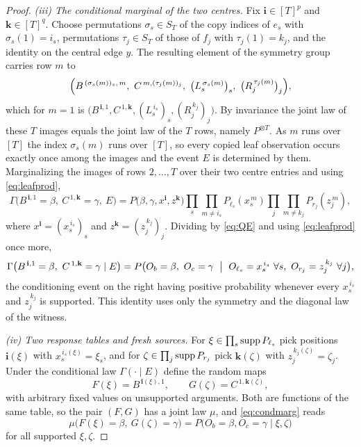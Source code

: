\documentclass[11pt]{article}
\theoremstyle{plain}
\theoremstyle{definition}
\begin{document}
\begin{proof}
\medskip
\emph{(iii) The conditional marginal of the two centres.}
Fix $\mathbf i\in[T]^p$ and $\mathbf k\in[T]^q$. Choose permutations $\sigma_s\in S_T$ of the copy indices of $e_s$ with $\sigma_s(1)=i_s$, permutations $\tau_j\in S_T$ of those of $f_j$ with $\tau_j(1)=k_j$, and the identity on the central edge $y$. The resulting element of the symmetry group carries row $m$ to
\[
\Bigl(B^{\,(\sigma_s(m))_s,\,m},\ C^{\,m,(\tau_j(m))_j},\ \bigl(L_s^{\,\sigma_s(m)}\bigr)_s,\ \bigl(R_j^{\,\tau_j(m)}\bigr)_j\Bigr),
\]
which for $m=1$ is $\bigl(B^{\,\mathbf i,1},C^{\,1,\mathbf k},(L_s^{\,i_s})_s,(R_j^{\,k_j})_j\bigr)$. By invariance the joint law of these $T$ images equals the joint law of the $T$ rows, namely $P^{\otimes T}$. As $m$ runs over $[T]$ the index $\sigma_s(m)$ runs over $[T]$, so every copied leaf observation occurs exactly once among the images and the event $E$ is determined by them. Marginalizing the images of rows $2,\dots,T$ over their two centre entries and using \eqref{eq:leafprod},
\[
\Gamma\bigl(B^{\,\mathbf i,1}=\beta,\ C^{\,1,\mathbf k}=\gamma,\ E\bigr)
=P\bigl(\beta,\gamma,x^{\mathbf i},z^{\mathbf k}\bigr)
\prod_s\prod_{m\ne i_s}P_{\ell_s}(x_s^{\,m})\prod_j\prod_{m\ne k_j}P_{r_j}(z_j^{\,m}),
\]
where $x^{\mathbf i}=(x_s^{\,i_s})_s$ and $z^{\mathbf k}=(z_j^{\,k_j})_j$. Dividing by \eqref{eq:QE} and using \eqref{eq:leafprod} once more,
\begin{equation}\label{eq:condmarg}
\Gamma\bigl(B^{\,\mathbf i,1}=\beta,\ C^{\,1,\mathbf k}=\gamma\mid E\bigr)
=P\bigl(O_b=\beta,\ O_c=\gamma\ \bigm|\ O_{\ell_s}=x_s^{\,i_s}\ \forall s,\ O_{r_j}=z_j^{\,k_j}\ \forall j\bigr),
\end{equation}
the conditioning event on the right having positive probability whenever every $x_s^{\,i_s}$ and $z_j^{\,k_j}$ is supported. This identity uses only the symmetry and the diagonal law of the witness.

\medskip
\emph{(iv) Two response tables and fresh sources.}
For $\xi\in\prod_s\operatorname{supp} P_{\ell_s}$ pick positions $\mathbf i(\xi)$ with $x_s^{\,i_s(\xi)}=\xi_s$, and for $\zeta\in\prod_j\operatorname{supp} P_{r_j}$ pick $\mathbf k(\zeta)$ with $z_j^{\,k_j(\zeta)}=\zeta_j$. Under the conditional law $\Gamma(\cdot\mid E)$ define the random maps
\[
F(\xi)=B^{\,\mathbf i(\xi),1},\qquad G(\zeta)=C^{\,1,\mathbf k(\zeta)},
\]
with arbitrary fixed values on unsupported arguments. Both are functions of the same table, so the pair $(F,G)$ has a joint law $\mu$, and \eqref{eq:condmarg} reads
\begin{equation}\label{eq:mutable}
\mu\bigl(F(\xi)=\beta,\ G(\zeta)=\gamma\bigr)=P\bigl(O_b=\beta,O_c=\gamma\mid\xi,\zeta\bigr)
\end{equation}
for all supported $\xi,\zeta$.


\end{proof}
\end{document}

